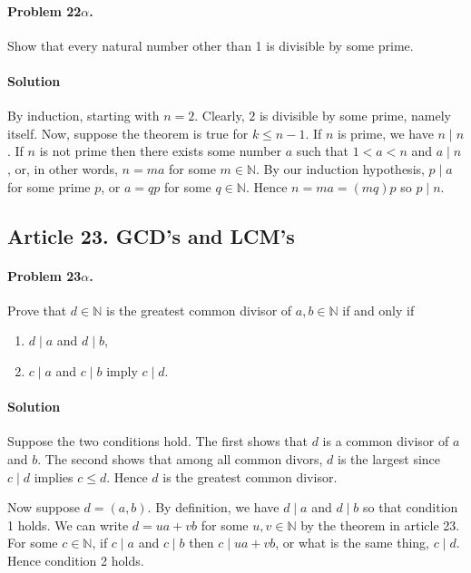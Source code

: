 \paragraph{Problem 22$\alpha$.}
Show that every natural number other than 1 is divisible by some prime.

\paragraph*{Solution}
By induction, starting with $ n = 2 $. Clearly, $2$ is divisible by some prime,
namely itself. Now, suppose the theorem is true for $ k \leq n - 1 $. If $n$ is
prime, we have $n \mid n$. If $n$ is not prime then there exists some number
$ a $ such that $ 1 < a < n $ and $ a \mid n $, or, in other words, $ n = ma$
for some $m \in \mathbb{N}$. By our induction hypothesis,
$ p \mid a $ for some prime $p$, or $ a = qp $ for some
$ q \in \mathbb{N} $. Hence $ n = ma = (mq)p $ so $ p \mid n $.

\subsection{Article 23. GCD's and LCM's}

\paragraph{Problem 23$\alpha$.}
Prove that $ d \in \mathbb{N} $ is the greatest common divisor of $ a, b \in
\mathbb{N} $ if and only if
\begin{enumerate}
\item $ d \mid a $ and $ d \mid b $,
\item $ c \mid a $ and $ c \mid b $ imply $ c \mid d $.
\end{enumerate}

\paragraph*{Solution}
Suppose the two conditions hold. The first shows that $ d $ is a common divisor
of $ a $ and $ b $. The second shows that among all common divors,
$ d $ is the largest since $ c \mid d $ implies $ c \leq d $. Hence $ d $ is
the greatest common divisor.

Now suppose $ d = (a, b) $. By definition, we have $ d \mid a $ and $ d \mid b $
so that condition 1 holds.
We can write $ d = ua + vb $ for some $ u, v \in \mathbb{N} $ by the theorem
in article 23. For some $ c \in \mathbb{N} $, if $ c \mid a $ and $ c \mid b $
then $ c \mid ua + vb $, or what is the same thing, $ c \mid d $. Hence condition
2 holds.

